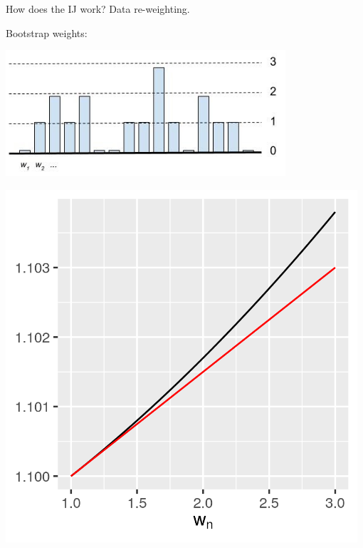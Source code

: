 \documentclass[8pt]{beamer}\usepackage[]{graphicx}\usepackage[]{color}
\begin{document}
\begin{frame}{How does the IJ work?  Data re-weighting.}
\begin{minipage}{0.49\textwidth}
    \par Bootstrap weights: \par
    \includegraphics[width=0.78\textwidth]{boot_weights}
\end{minipage}
\begin{minipage}{0.49\textwidth}
    \includegraphics[width=0.98\textwidth]{weight_slope}
\end{minipage}


\end{frame}







\end{document}
